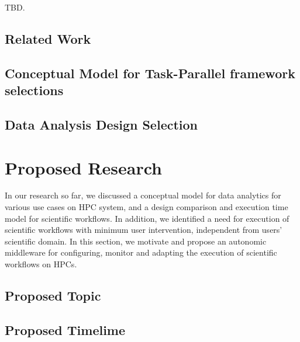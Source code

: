 TBD.

\subsection{Related Work}
\label{relatedwork}




\subsection{Conceptual Model for Task-Parallel framework selections}

\subsection{Data Analysis Design Selection}


\section{Proposed Research}

In our research so far, we discussed a conceptual model for data analytics for 
various use cases on HPC system, and a design comparison and execution time model 
for scientific workflows. In addition, we identified a need for execution of 
scientific workflows with minimum user intervention, independent from users' 
scientific domain. In this section, we motivate and propose an autonomic middleware 
for configuring, monitor and adapting the execution of scientific workflows on 
HPCs.

\subsection{Proposed Topic}



\subsection{Proposed Timelime}





